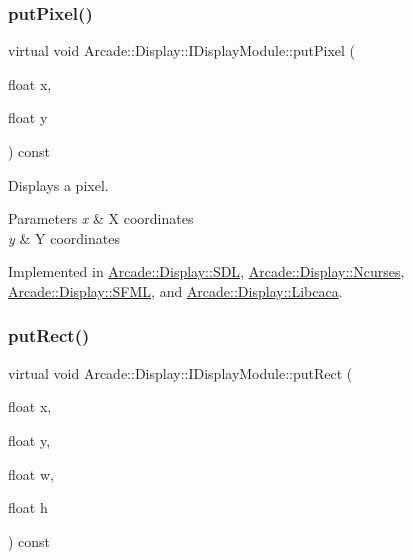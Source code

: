 \mbox{\label{classArcade_1_1Display_1_1IDisplayModule_a86a61eaa1d0cf2ddfdedbaa04054da90}} 
\subsubsection{\texorpdfstring{putPixel()}{putPixel()}}
{\footnotesize\ttfamily virtual void Arcade\+::\+Display\+::\+I\+Display\+Module\+::put\+Pixel (\begin{DoxyParamCaption}\item[{float}]{x,  }\item[{float}]{y }\end{DoxyParamCaption}) const\hspace{0.3cm}{\ttfamily [pure virtual]}}



Displays a pixel. 


\begin{DoxyParams}{Parameters}
{\em x} & X coordinates \\
\hline
{\em y} & Y coordinates \\
\hline
\end{DoxyParams}


Implemented in \mbox{\hyperlink{classArcade_1_1Display_1_1SDL_a5c3f965b3394c9654f3537cab1201c1c}{Arcade\+::\+Display\+::\+S\+DL}}, \mbox{\hyperlink{classArcade_1_1Display_1_1Ncurses_a78be67c84498f97a781906f17f3e5f61}{Arcade\+::\+Display\+::\+Ncurses}}, \mbox{\hyperlink{classArcade_1_1Display_1_1SFML_a68417ef6b0450c6c7e6fa022699a2c3b}{Arcade\+::\+Display\+::\+S\+F\+ML}}, and \mbox{\hyperlink{classArcade_1_1Display_1_1Libcaca_a857080fd758f300ef2b05563d5814a1f}{Arcade\+::\+Display\+::\+Libcaca}}.

\mbox{\label{classArcade_1_1Display_1_1IDisplayModule_a4c4072d7444006b9a0ba134c684e58b5}} 
\subsubsection{\texorpdfstring{putRect()}{putRect()}}
{\footnotesize\ttfamily virtual void Arcade\+::\+Display\+::\+I\+Display\+Module\+::put\+Rect (\begin{DoxyParamCaption}\item[{float}]{x,  }\item[{float}]{y,  }\item[{float}]{w,  }\item[{float}]{h }\end{DoxyParamCaption}) const\hspace{0.3cm}{\ttfamily [pure virtual]}}



